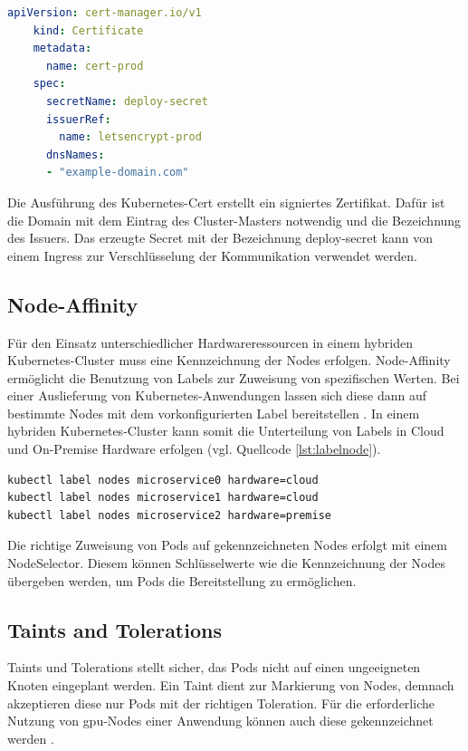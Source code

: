 \begin{lstlisting}[caption={cert.yaml \cite{certmanageracme} },captionpos=b,label={lst:cert},language=yaml]
    apiVersion: cert-manager.io/v1
    kind: Certificate
    metadata:
      name: cert-prod
    spec:
      secretName: deploy-secret
      issuerRef: 
        name: letsencrypt-prod
      dnsNames:
      - "example-domain.com"

\end{lstlisting}

Die Ausführung des Kubernetes-Cert erstellt ein signiertes Zertifikat.
Dafür ist die Domain mit dem Eintrag des Cluster-Masters notwendig und die Bezeichnung des Issuers.
Das erzeugte Secret mit der Bezeichnung deploy-secret kann von einem Ingress zur Verschlüsselung der Kommunikation verwendet werden.

\subsection{Node-Affinity} \label{Nodeaffinity}
Für den Einsatz unterschiedlicher Hardwareressourcen in einem hybriden Kubernetes-Cluster muss eine Kennzeichnung der Nodes erfolgen.
Node-Affinity ermöglicht die Benutzung von Labels zur Zuweisung von spezifischen Werten.
Bei einer Auslieferung von Kubernetes-Anwendungen lassen sich diese dann auf bestimmte Nodes mit dem vorkonfigurierten Label bereitstellen \cite{nodeaffinity}.
In einem hybriden Kubernetes-Cluster kann somit die Unterteilung von Labels in Cloud und On-Premise Hardware erfolgen (vgl. Quellcode \ref{lst:labelnode}).


\begin{lstlisting}[caption={Node-Labels},captionpos=b,label={lst:labelnode},language=bash]
kubectl label nodes microservice0 hardware=cloud
kubectl label nodes microservice1 hardware=cloud
kubectl label nodes microservice2 hardware=premise
\end{lstlisting}

Die richtige Zuweisung von Pods auf gekennzeichneten Nodes erfolgt mit einem NodeSelector.
Diesem können Schlüsselwerte wie die Kennzeichnung der Nodes übergeben werden, um Pods die Bereitstellung zu ermöglichen.

\subsection{Taints and Tolerations}
Taints und Tolerations stellt sicher, das Pods nicht auf einen ungeeigneten Knoten eingeplant werden.
Ein Taint dient zur Markierung von Nodes, demnach akzeptieren diese nur Pods mit der richtigen Toleration.
Für die erforderliche Nutzung von \acs{gpu}-Nodes einer Anwendung können auch diese gekennzeichnet werden \cite{taintstolerations}.

